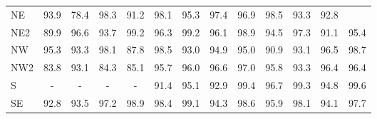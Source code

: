 \begin{table}[H]
\begin{tabular}{lcccccccccccc}
        NE                                         & 93.9                     & 78.4                                                & 98.3                     & 91.2                     & 98.1                     & 95.3                     & 97.4                 & 96.9 & 98.5                 & 93.3                                                & 92.8                                                & \cellcolor[HTML]{CB0000}{\color[HTML]{FFFFFF} 32.8} \\
        NE2                                        & 89.9                     & 96.6                                                & 93.7                     & 99.2                     & 96.3                     & 99.2                     & 96.1                 & 98.9 & 94.5                 & 97.3                                                & 91.1                                                & 95.4                                                \\
        NW                                         & 95.3                     & 93.3                                                & 98.1                     & 87.8                     & 98.5                     & 93.0                     & 94.9                 & 95.0 & 90.9                 & 93.1                                                & 96.5                                                & 98.7                                                \\
        NW2                                        & 83.8                     & 93.1                                                & 84.3                     & 85.1                     & 95.7                     & 96.0                     & 96.6                 & 97.0 & 95.8                 & 93.3                                                & 96.4                                                & 96.4                                                \\
        S                                          & -                        & -                                                   & -                        & -                        & 91.4                     & 95.1                     & 92.9                 & 99.4 & 96.7                 & 99.3                                                & 94.8                                                & 99.6                                                \\
        SE                                         & 92.8                     & 93.5                                                & 97.2                     & 98.9                     & 98.4                     & 99.1                     & 94.3                 & 98.6 & 95.9                 & 98.1                                                & 94.1                                                & 97.7                                                \\

\end{tabular}
\end{table}
